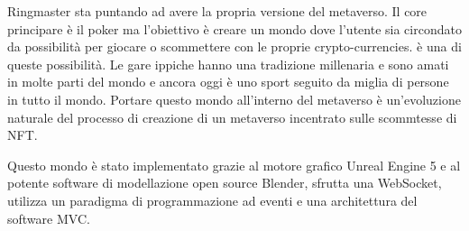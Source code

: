 Ringmaster sta puntando ad avere la propria versione del metaverso.
%
Il core principare è il poker ma l'obiettivo è creare un mondo dove l'utente sia circondato da possibilit\`a per giocare o scommettere con le proprie crypto-currencies.
%
\nomeapp{} è una di queste possibilità.
%
Le gare ippiche hanno una tradizione millenaria e sono amati in molte parti del mondo e ancora oggi \`e uno sport seguito da miglia di persone in tutto il mondo. 
%
Portare questo mondo all'interno del metaverso \`e un'evoluzione naturale del processo di creazione di un metaverso incentrato sulle scommtesse di NFT. 

Questo mondo è stato implementato grazie al motore grafico Unreal Engine 5 e al potente software di modellazione open source Blender, sfrutta una WebSocket, utilizza un paradigma di programmazione ad eventi e una architettura del software MVC. 
%

%